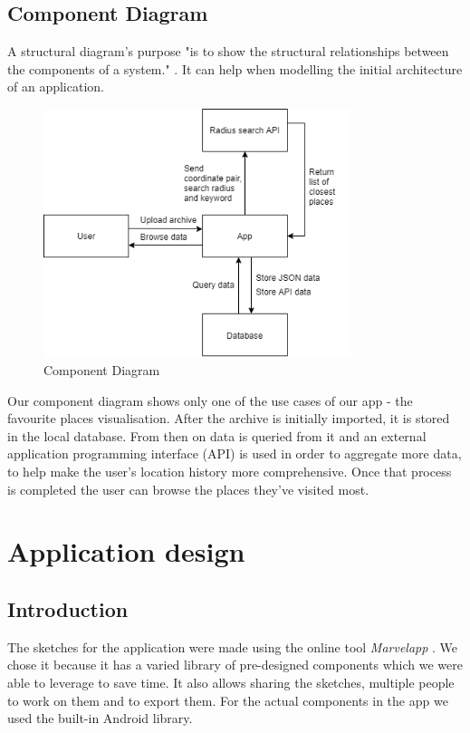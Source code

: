 \documentclass[12p]{article}
\begin{document}
    \newpage
    \subsection{Component Diagram}
    A structural diagram's purpose "is to show the structural relationships between the components of a system." \cite{ComponentDiagrams}. It can help when modelling the initial architecture of an application.
 
    \begin{figure}[H]
        \center
        \includegraphics[width=0.8\textwidth,keepaspectratio]{pics/diagrams/ComponentDiagram.png}
	    \caption{Component Diagram}
    \end{figure}
    
    Our component diagram shows only one of the use cases of our app - the favourite places visualisation. After the archive is initially imported, it is stored in the local database. From then on data is queried from it and an external application programming interface (API) is used in order to aggregate more data, to help make the user's location history more comprehensive. Once that process is completed the user can browse the places they've visited most.
    

\clearpage
\section{Application design} \label{sec:SoftwareDesign}
    \subsection{Introduction}
    The sketches for the application were made using the online tool \textit{Marvelapp} \cite{Marvelapp}. We chose it because it has a varied library of pre-designed components which we were able to leverage to save time. It also allows sharing the sketches, multiple people to work on them and to export them.
    For the actual components in the app we used the built-in Android library.
    
\end{document}
